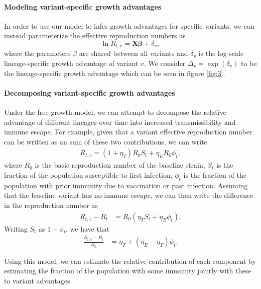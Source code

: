 \documentclass[11pt,oneside,letterpaper]{article}
\renewcommand{\vec}[1]{\boldsymbol{#1}}
\begin{document}
\paragraph{Modeling variant-specific growth advantages}%

In order to use our model to infer growth advantages for specific variants, we can instead parameterize the effective reproduction numbers as
\begin{equation}
\ln R_{t,v} = \vec{X} \vec{\beta} + \delta_{v},
\end{equation}
where the parameters $\beta$ are shared between all variants and $\delta_{v}$ is the log-scale lineage-specific growth advantage of variant $v$.
We consider $\Delta_{v} = \exp(\delta_{v})$ to be the lineage-specific growth advantage which can be seen in figure \ref{fig:3}.

\paragraph{Decomposing variant-specific growth advantages}%

Under the free growth model, we can attempt to decompose the relative advantage of different lineages over time into increased transmissibility and immune escape. For example, given that a variant effective reproduction number can be written as an sum of these two contributions, we can write
\begin{align*}
  R_{t,v} = (1+\eta_{T}) R_{0} S_{t} + \eta_{E} R_{0} \phi_{t},
\end{align*}
where $R_{0}$ is the basic reproduction number of the baseline strain, $S_{t}$ is the fraction of the population susceptible to first infection, $\phi_{t}$ is the fraction of the population with prior immunity due to vaccination or past infection. Assuming that the baseline variant has no immune escape, we can then write the difference in the reproduction number as
\begin{align*}
  R_{t,v} - R_{t} &= R_{0} (\eta_{T} S_{t} + \eta_{E} \phi_{t}).
\end{align*}
Writing $S_{t}$ as $1 - \phi_{t}$, we have that
\begin{align*}
  \frac{R_{t,v}-R_{t}}{R_{0}} &= \eta_{T} + (\eta_{E} - \eta_{T})\phi_{t}. 
\end{align*}

Using this model, we can estimate the relative contribution of each component by estimating the fraction of the population with some immunity jointly with these to variant advantages.
\end{document}

